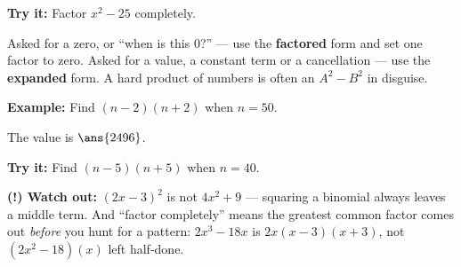 \documentclass[12pt]{article}
\begin{document}
\begin{tryitbox}
\textbf{Try it:} Factor $x^2-25$ completely.\\[2pt]
\end{tryitbox}


\begin{formulabox}
Asked for a zero, or ``when is this $0$?'' --- use the \textbf{factored} form
and set one factor to zero. Asked for a value, a constant term or a
cancellation --- use the \textbf{expanded} form. A hard product of numbers is
often an $A^2-B^2$ in disguise.
\end{formulabox}

\begin{examplebox}
\textbf{Example:} Find $(n-2)(n+2)$ when $n=50$.

The value is $\ans{2496}$.
\end{examplebox}

\begin{tryitbox}
\textbf{Try it:} Find $(n-5)(n+5)$ when $n=40$.\\[2pt]
\end{tryitbox}

\begin{watchoutbox}
\textbf{(!) Watch out:} $(2x-3)^2$ is not $4x^2+9$ --- squaring a binomial
always leaves a middle term. And ``factor completely'' means the greatest
common factor comes out \emph{before} you hunt for a pattern: $2x^3-18x$ is
$2x(x-3)(x+3)$, not $(2x^2-18)(x)$ left half-done.
\end{watchoutbox}
\end{document}
